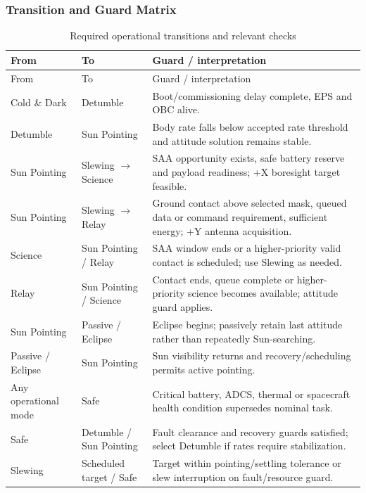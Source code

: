 \subsubsection{Transition and Guard Matrix}\label{app:op-logic-matrix}
\begin{longtable}{@{}p{2.25cm}p{2.55cm}p{6.9cm}@{}}
\caption{Required operational transitions and relevant checks}\label{tab:op-transition-matrix}\\\toprule
From & To & Guard / interpretation\\\midrule\endfirsthead\toprule From & To & Guard / interpretation\\\midrule\endhead
Cold \& Dark & Detumble & Boot/commissioning delay complete, EPS and OBC alive.\\
Detumble & Sun Pointing & Body rate falls below accepted rate threshold and attitude solution remains stable.\\
Sun Pointing & Slewing $\to$ Science & SAA opportunity exists, safe battery reserve and payload readiness; +X boresight target feasible.\\
Sun Pointing & Slewing $\to$ Relay & Ground contact above selected mask, queued data or command requirement, sufficient energy; +Y antenna acquisition.\\
Science & Sun Pointing / Relay & SAA window ends or a higher-priority valid contact is scheduled; use Slewing as needed.\\
Relay & Sun Pointing / Science & Contact ends, queue complete or higher-priority science becomes available; attitude guard applies.\\
Sun Pointing & Passive / Eclipse & Eclipse begins; passively retain last attitude rather than repeatedly Sun-searching.\\
Passive / Eclipse & Sun Pointing & Sun visibility returns and recovery/scheduling permits active pointing.\\
Any operational mode & Safe & Critical battery, ADCS, thermal or spacecraft health condition supersedes nominal task.\\
Safe & Detumble / Sun Pointing & Fault clearance and recovery guards satisfied; select Detumble if rates require stabilization.\\
Slewing & Scheduled target / Safe & Target within pointing/settling tolerance or slew interruption on fault/resource guard.\\\bottomrule\end{longtable}

